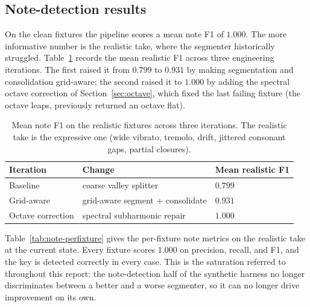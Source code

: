\documentclass[12pt,a4paper]{article}
\begin{document}
\subsection{Note-detection results}
\label{sec:results-note}

On the clean fixtures the pipeline scores a mean note F1 of $1.000$. The more
informative number is the realistic take, where the segmenter historically
struggled. Table~\ref{tab:note-progression} records the mean realistic F1
across three engineering iterations. The first raised it from $0.799$ to
$0.931$ by making segmentation and consolidation grid-aware; the second raised
it to $1.000$ by adding the spectral octave correction of
Section~\ref{sec:octave}, which fixed the last failing fixture (the octave
leaps, previously returned an octave flat).

\begin{table}[H]
\centering
\caption{Mean note F1 on the realistic fixtures across three iterations. The
realistic take is the expressive one (wide vibrato, tremolo, drift, jittered
consonant gaps, partial closures).}
\label{tab:note-progression}
\begin{tabular}{l l l}
\toprule
\textbf{Iteration} & \textbf{Change} & \textbf{Mean realistic F1} \\
\midrule
Baseline              & coarse valley splitter                 & $0.799$ \\
Grid-aware            & grid-aware segment + consolidate        & $0.931$ \\
Octave correction     & spectral subharmonic repair             & $1.000$ \\
\bottomrule
\end{tabular}
\end{table}

Table~\ref{tab:note-perfixture} gives the per-fixture note metrics on the
realistic take at the current state. Every fixture scores $1.000$ on precision,
recall, and F1, and the key is detected correctly in every case. This is the
saturation referred to throughout this report: the note-detection half of the
synthetic harness no longer discriminates between a better and a worse
segmenter, so it can no longer drive improvement on its own.
\end{document}

